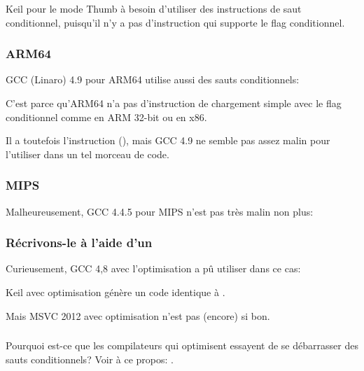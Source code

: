 Keil \Optimizing pour le mode Thumb à besoin d'utiliser des instructions de saut
conditionnel, puisqu'il n'y a pas d'instruction qui supporte le flag conditionnel.



\subsubsection{ARM64}

GCC (Linaro) 4.9 \Optimizing pour ARM64 utilise aussi des sauts conditionnels:



C'est parce qu'ARM64 n'a pas d'instruction de chargement simple avec le flag conditionnel
comme  en ARM 32-bit ou  en x86.

Il a toutefois l'instruction  (),
mais GCC 4.9 ne semble pas assez malin pour l'utiliser dans un tel morceau de code.

\subsubsection{MIPS}

Malheureusement, GCC 4.4.5 pour MIPS n'est pas très malin non plus:



\subsubsection{Récrivons-le à l'aide d'un}




Curieusement, GCC 4,8 avec l'optimisation a pû utiliser  dans ce cas:



Keil avec optimisation génère un code identique à .

Mais MSVC 2012 avec optimisation n'est pas (encore) si bon.

\subsubsection{\Conclusion{}}

Pourquoi est-ce que les compilateurs qui optimisent essayent de se débarrasser des
sauts conditionnels? Voir à ce propos: .
